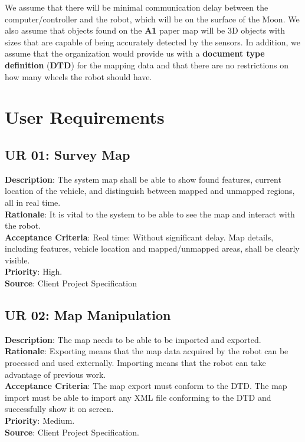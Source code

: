 \documentclass[12pt,a4paper]{article}
\begin{document}
    We assume that there will be minimal communication delay between the computer/controller and the robot, which will be on the surface of the Moon. We also assume that objects found on the \textbf{A1} paper map will be 3D objects with sizes that are capable of being accurately detected by the sensors. In addition, we assume that the organization would provide us with a \textbf{document type definition} (\textbf{DTD}) for the mapping data and that there are no restrictions on how many wheels the robot should have.
    
	\newpage
    
	\section{User Requirements}
    \subsection{UR 01: Survey Map}
    \textbf{Description}: The system map shall be able to show found features, current location of the vehicle, and distinguish between mapped and unmapped regions, all in real time.\\
    \textbf{Rationale}: It is vital to the system to be able to see the map and interact with the robot.\\
    \textbf{Acceptance Criteria}: Real time: Without significant delay. Map details, including features, vehicle location and mapped/unmapped areas, shall be clearly visible. \\
    \textbf{Priority}: High.\\
    \textbf{Source}: Client Project Specification\\
    
    \subsection{UR 02: Map Manipulation}
    \textbf{Description}: The map needs to be able to be imported and exported. \\
    \textbf{Rationale}: Exporting means that the map data acquired by the robot can be processed and used externally. Importing means that the robot can take advantage of previous work.\\
    \textbf{Acceptance Criteria}: The map export must conform to the DTD. The map import must be able to import any XML file conforming to the DTD and successfully show it on screen.\\
    \textbf{Priority}: Medium.\\
    \textbf{Source}: Client Project Specification.\\
    
\end{document}
